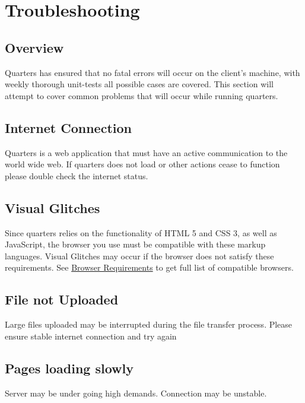 \documentclass[12pt]{article}
\begin{document}
    \section{Troubleshooting}

    \subsection{Overview}
    Quarters has ensured that no fatal errors will occur on the client's machine, with weekly thorough unit-tests all possible cases are covered. This section will attempt to cover common problems that will occur while running quarters.

    \subsection{Internet Connection}
    Quarters is a web application that must have an active communication to the world wide web. If quarters does not load or other actions cease to function please double check the internet status.

    \subsection{Visual Glitches}
    Since quarters relies on the functionality of HTML 5 and CSS 3, as well as JavaScript, the browser you use must be compatible with these markup languages. Visual Glitches may occur if the browser does not satisfy these requirements. See \hyperref[sec:browserRequirement]{Browser Requirements} to get full list of compatible browsers.

    \subsection{File not Uploaded}
    Large files uploaded may be interrupted during the file transfer process. Please ensure stable internet connection and try again

    \subsection{Pages loading slowly}
    Server may be under going high demands. Connection may be unstable.

\end{document}
